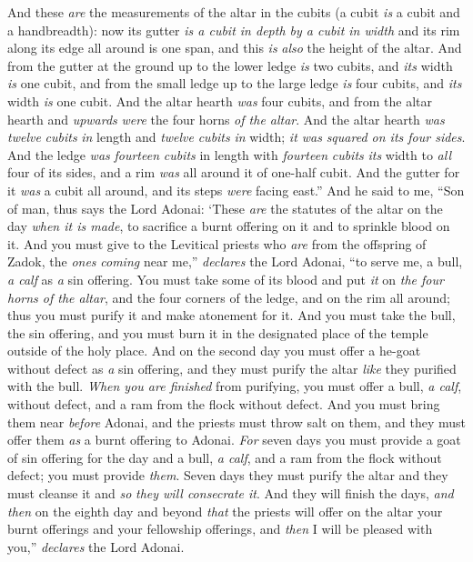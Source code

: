 \begin{biblechapter}
\verse And these \textit{are} the measurements of the altar in the cubits (a cubit \textit{is} a cubit and a handbreadth): now its gutter \textit{is a cubit in depth by a cubit in width} and its rim along its edge all around is one span, and this \textit{is} \textit{also} the height of the altar.
\verse And from the gutter at the ground up to the lower ledge \textit{is} two cubits, and \textit{its} width \textit{is} one cubit, and from the small ledge up to the large ledge \textit{is} four cubits, and \textit{its} width \textit{is} one cubit.
\verse And the altar hearth \textit{was} four cubits, and from the altar hearth and \textit{upwards} \textit{were} the four horns \textit{of the altar}.
\verse And the altar hearth \textit{was} \textit{twelve} \textit{cubits} \textit{in} length and \textit{twelve} \textit{cubits} \textit{in} width; \textit{it was} \textit{squared on its four sides}.
\verse And the ledge \textit{was} \textit{fourteen} \textit{cubits} in length with \textit{fourteen} \textit{cubits} \textit{its} width to \textit{all} four of its sides, and a rim \textit{was} all around it of one-half cubit. And the gutter for it \textit{was} a cubit all around, and its steps \textit{were} facing east.”
\verse And he said to me, “Son of man, thus says the Lord Adonai: ‘These \textit{are} the statutes of the altar on the day \textit{when it is made}, to sacrifice a burnt offering on it and to sprinkle blood on it.
\verse And you must give to the Levitical priests who \textit{are} from the offspring of Zadok, the \textit{ones} \textit{coming} near me,” \textit{declares} the Lord Adonai, “to serve me, a bull, \textit{a calf} as \textit{a} sin offering.
\verse You must take some of its blood and put \textit{it} on \textit{the four horns of the altar}, and the four corners of the ledge, and on the rim all around; thus you must purify it and make atonement for it.
\verse And you must take the bull, the sin offering, and you must burn it in the designated place of the temple outside of the holy place.
\verse And on the second day you must offer a he-goat without defect as \textit{a} sin offering, and they must purify the altar \textit{like} they purified with the bull.
\verse \textit{When you are finished} from purifying, you must offer a bull, \textit{a calf}, without defect, and a ram from the flock without defect.
\verse And you must bring them near \textit{before} Adonai, and the priests must throw salt on them, and they must offer them \textit{as} a burnt offering to Adonai.
\verse \textit{For} seven days you must provide a goat of sin offering for the day and a bull, \textit{a calf}, and a ram from the flock without defect; you must provide \textit{them}.
\verse Seven days they must purify the altar and they must cleanse it and \textit{so} \textit{they will consecrate it}.
\verse And they will finish the days, \textit{and then} on the eighth day and beyond \textit{that} the priests will offer on the altar your burnt offerings and your fellowship offerings, and \textit{then} I will be pleased with you,” \textit{declares} the Lord Adonai.
\end{biblechapter}

